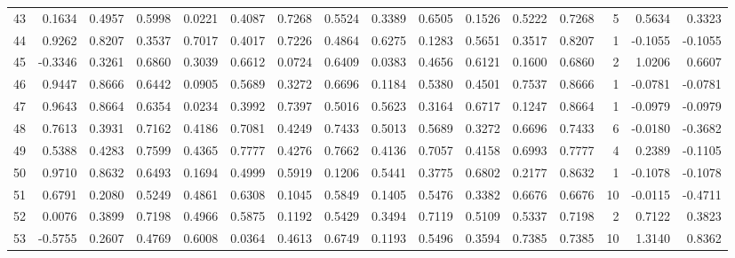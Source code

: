 \begin{tabular}{lrrrrrrrrrrrrrrr}
43  &      0.1634 &  0.4957 &  0.5998 &  0.0221 &  0.4087 &  0.7268 &  0.5524 &  0.3389 &  0.6505 &  0.1526 &   0.5222 &     0.7268 &      5 &                    0.5634 &                     0.3323 \\
44  &      0.9262 &  0.8207 &  0.3537 &  0.7017 &  0.4017 &  0.7226 &  0.4864 &  0.6275 &  0.1283 &  0.5651 &   0.3517 &     0.8207 &      1 &                   -0.1055 &                    -0.1055 \\
45  &     -0.3346 &  0.3261 &  0.6860 &  0.3039 &  0.6612 &  0.0724 &  0.6409 &  0.0383 &  0.4656 &  0.6121 &   0.1600 &     0.6860 &      2 &                    1.0206 &                     0.6607 \\
46  &      0.9447 &  0.8666 &  0.6442 &  0.0905 &  0.5689 &  0.3272 &  0.6696 &  0.1184 &  0.5380 &  0.4501 &   0.7537 &     0.8666 &      1 &                   -0.0781 &                    -0.0781 \\
47  &      0.9643 &  0.8664 &  0.6354 &  0.0234 &  0.3992 &  0.7397 &  0.5016 &  0.5623 &  0.3164 &  0.6717 &   0.1247 &     0.8664 &      1 &                   -0.0979 &                    -0.0979 \\
48  &      0.7613 &  0.3931 &  0.7162 &  0.4186 &  0.7081 &  0.4249 &  0.7433 &  0.5013 &  0.5689 &  0.3272 &   0.6696 &     0.7433 &      6 &                   -0.0180 &                    -0.3682 \\
49  &      0.5388 &  0.4283 &  0.7599 &  0.4365 &  0.7777 &  0.4276 &  0.7662 &  0.4136 &  0.7057 &  0.4158 &   0.6993 &     0.7777 &      4 &                    0.2389 &                    -0.1105 \\
50  &      0.9710 &  0.8632 &  0.6493 &  0.1694 &  0.4999 &  0.5919 &  0.1206 &  0.5441 &  0.3775 &  0.6802 &   0.2177 &     0.8632 &      1 &                   -0.1078 &                    -0.1078 \\
51  &      0.6791 &  0.2080 &  0.5249 &  0.4861 &  0.6308 &  0.1045 &  0.5849 &  0.1405 &  0.5476 &  0.3382 &   0.6676 &     0.6676 &     10 &                   -0.0115 &                    -0.4711 \\
52  &      0.0076 &  0.3899 &  0.7198 &  0.4966 &  0.5875 &  0.1192 &  0.5429 &  0.3494 &  0.7119 &  0.5109 &   0.5337 &     0.7198 &      2 &                    0.7122 &                     0.3823 \\
53  &     -0.5755 &  0.2607 &  0.4769 &  0.6008 &  0.0364 &  0.4613 &  0.6749 &  0.1193 &  0.5496 &  0.3594 &   0.7385 &     0.7385 &     10 &                    1.3140 &                     0.8362 \\

\end{tabular}
